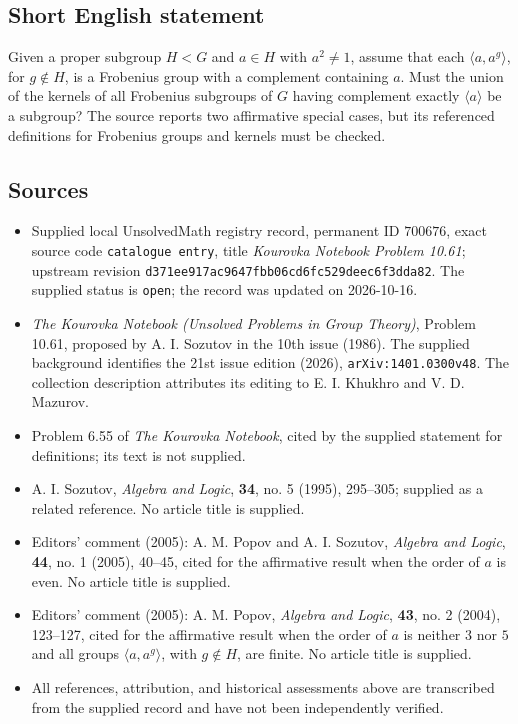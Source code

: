 \documentclass[11pt]{article}
\begin{document}
\subsection{Short English statement}
Given a proper subgroup \(H<G\) and \(a\in H\) with \(a^2\ne1\), assume that each \(\langle a,a^g\rangle\), for \(g\notin H\), is a Frobenius group with a complement containing \(a\). Must the union of the kernels of all Frobenius subgroups of \(G\) having complement exactly \(\langle a\rangle\) be a subgroup? The source reports two affirmative special cases, but its referenced definitions for Frobenius groups and kernels must be checked.
\subsection{Sources}
\begin{itemize}
\item Supplied local UnsolvedMath registry record, permanent ID \(700676\), exact source code \texttt{catalogue entry}, title \emph{Kourovka Notebook Problem 10.61}; upstream revision \texttt{d371ee917ac9647fbb06cd6fc529deec6f3dda82}. The supplied status is \texttt{open}; the record was updated on 2026-10-16.
\item \emph{The Kourovka Notebook (Unsolved Problems in Group Theory)}, Problem 10.61, proposed by A. I. Sozutov in the 10th issue (1986). The supplied background identifies the 21st issue edition (2026), \texttt{arXiv:1401.0300v48}. The collection description attributes its editing to E. I. Khukhro and V. D. Mazurov.
\item Problem 6.55 of \emph{The Kourovka Notebook}, cited by the supplied statement for definitions; its text is not supplied.
\item A. I. Sozutov, \emph{Algebra and Logic}, \textbf{34}, no. 5 (1995), 295--305; supplied as a related reference. No article title is supplied.
\item Editors' comment (2005): A. M. Popov and A. I. Sozutov, \emph{Algebra and Logic}, \textbf{44}, no. 1 (2005), 40--45, cited for the affirmative result when the order of \(a\) is even. No article title is supplied.
\item Editors' comment (2005): A. M. Popov, \emph{Algebra and Logic}, \textbf{43}, no. 2 (2004), 123--127, cited for the affirmative result when the order of \(a\) is neither \(3\) nor \(5\) and all groups \(\langle a,a^g\rangle\), with \(g\notin H\), are finite. No article title is supplied.
\item All references, attribution, and historical assessments above are transcribed from the supplied record and have not been independently verified.
\end{itemize}
\end{document}
